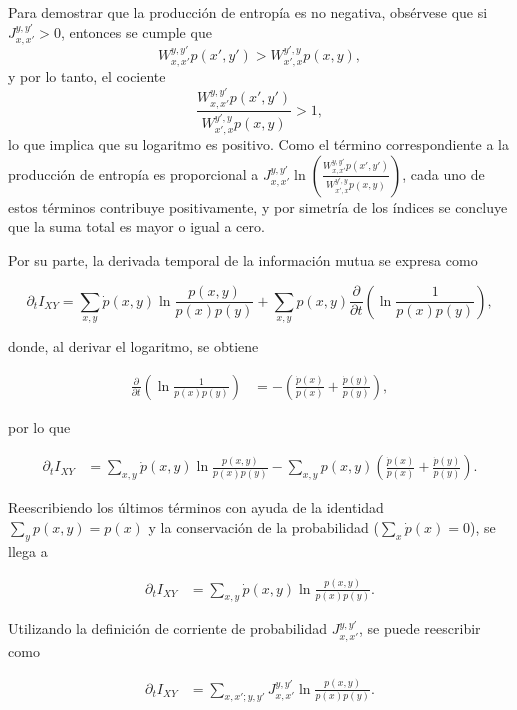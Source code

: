 \begin{appendixs}
Para demostrar que la producción de entropía es no negativa, obsérvese que si \( J_{x,x'}^{y,y'} > 0 \), entonces se cumple que 
\[
W_{x,x'}^{y,y'} p(x',y') > W_{x',x}^{y',y} p(x,y),
\]
y por lo tanto, el cociente
\[
\frac{W_{x,x'}^{y,y'} p(x',y')}{W_{x',x}^{y',y} p(x,y)} > 1,
\]
lo que implica que su logaritmo es positivo. Como el término correspondiente a la producción de entropía es proporcional a \( J_{x,x'}^{y,y'} \ln \left( \frac{W_{x,x'}^{y,y'} p(x',y')}{W_{x',x}^{y',y} p(x,y)} \right) \), cada uno de estos términos contribuye positivamente, y por simetría de los índices se concluye que la suma total es mayor o igual a cero.

Por su parte, la derivada temporal de la información mutua se expresa como

\begin{equation*}
    \partial_{t} I_{XY} = \sum_{x,y} \dot{p}(x,y) \ln \frac{p(x,y)}{p(x)p(y)} + \sum_{x,y} p(x,y) \frac{\partial}{\partial t} \left( \ln \frac{1}{p(x)p(y)} \right),
\end{equation*}

donde, al derivar el logaritmo, se obtiene

\begin{align*}
    \frac{\partial}{\partial t} \left( \ln \frac{1}{p(x)p(y)} \right) 
    &= - \left( \frac{\dot{p}(x)}{p(x)} + \frac{\dot{p}(y)}{p(y)} \right),
\end{align*}

por lo que

\begin{align*}
    \partial_{t} I_{XY} &= \sum_{x,y} \dot{p}(x,y) \ln \frac{p(x,y)}{p(x)p(y)} 
    - \sum_{x,y} p(x,y) \left( \frac{\dot{p}(x)}{p(x)} + \frac{\dot{p}(y)}{p(y)} \right).
\end{align*}

Reescribiendo los últimos términos con ayuda de la identidad \(\sum_{y} p(x,y) = p(x)\) y la conservación de la probabilidad (\(\sum_{x} \dot{p}(x) = 0\)), se llega a

\begin{align}
    \partial_{t} I_{XY} 
    &= \sum_{x,y} \dot{p}(x,y) \ln \frac{p(x,y)}{p(x)p(y)}.
\end{align}

Utilizando la definición de corriente de probabilidad \(J_{x,x'}^{y,y'}\), se puede reescribir como

\begin{align}
    \partial_{t} I_{XY} &= \sum_{x,x';y,y'} J_{x,x'}^{y,y'} \ln \frac{p(x,y)}{p(x)p(y)}.
\end{align}


\end{appendixs}
